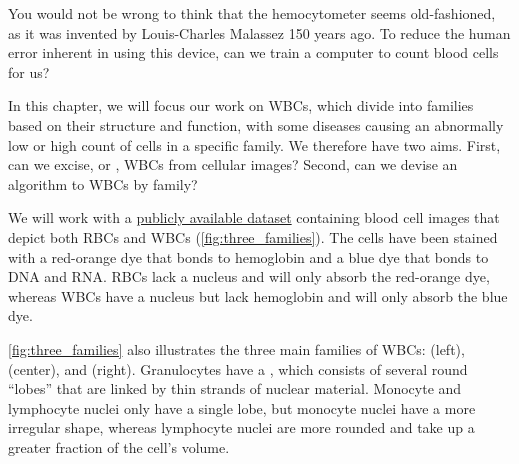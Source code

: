 \begin{qbox}\end{qbox}

You would not be wrong to think that the hemocytometer seems old-fashioned, as it was invented by Louis-Charles Malassez 150 years ago. To reduce the human error inherent in using this device, can we train a computer to count blood cells for us?

In this chapter, we will focus our work on WBCs, which divide into families based on their structure and function, with some diseases causing an abnormally low or high count of cells in a specific family. We therefore have two aims. First, can we excise, or , WBCs from cellular images?  Second, can we devise an algorithm to  WBCs by family?

We will work with a \href{https://github.com/Shenggan/BCCD_Dataset}{publicly available dataset} containing blood cell images that depict both RBCs and WBCs (\autoref{fig:three_families}). The cells have been stained with a red-orange dye that bonds to hemoglobin and a blue dye that bonds to DNA and RNA. RBCs lack a nucleus and will only absorb the red-orange dye, whereas WBCs have a nucleus but lack hemoglobin and will only absorb the blue dye.

\autoref{fig:three_families} also illustrates the three main families of WBCs:  (left),  (center), and  (right).  Granulocytes have a , which consists of several round ``lobes'' that are linked by thin strands of nuclear material. Monocyte and lymphocyte nuclei only have a single lobe, but monocyte nuclei have a more irregular shape, whereas lymphocyte nuclei are more rounded and take up a greater fraction of the cell's volume.\\


